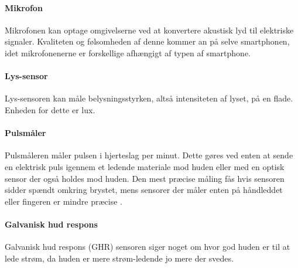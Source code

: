 \paragraph{Mikrofon}
Mikrofonen kan optage omgivelserne ved at konvertere akustisk lyd til elektriske signaler.
Kvaliteten og følsomheden af denne kommer an på selve smartphonen, idet mikrofonenerne er forskellige afhængigt af typen af smartphone. 

\paragraph{Lys-sensor}
Lys-sensoren kan måle belysningsstyrken, altså intensiteten af lyset, på en flade.
Enheden for dette er lux.

\paragraph{Pulsmåler}
Pulsmåleren måler pulsen i hjerteslag per minut.
Dette gøres ved enten at sende en elektrisk puls igennem et ledende materiale mod huden eller med en optisk sensor der også holdes mod huden.
Den mest præcise måling fås hvis sensoren sidder spændt omkring brystet, mens sensorer der måler enten på håndleddet eller fingeren er mindre præcise \citep{burke1998precision}.

\paragraph{Galvanisk hud respons}
Galvanisk hud respons (GHR) sensoren siger noget om hvor god huden er til at lede strøm, da huden er mere strøm-ledende jo mere der svedes.
